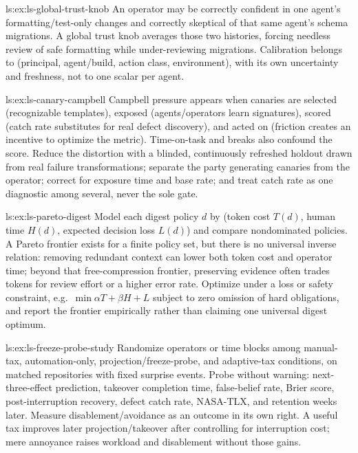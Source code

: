 \begin{pdSolution}{ls:ex:ls-global-trust-knob}
An operator may be correctly confident in one agent's formatting/test-only changes and correctly skeptical of that same agent's schema migrations. A global trust knob averages those two histories, forcing needless review of safe formatting while under-reviewing migrations. Calibration belongs to (principal, agent/build, action class, environment), with its own uncertainty and freshness, not to one scalar per agent.
\end{pdSolution}
\begin{pdSolution}{ls:ex:ls-canary-campbell}
Campbell pressure appears when canaries are selected (recognizable templates), exposed (agents/operators learn signatures), scored (catch rate substitutes for real defect discovery), and acted on (friction creates an incentive to optimize the metric). Time-on-task and breaks also confound the score. Reduce the distortion with a blinded, continuously refreshed holdout drawn from real failure transformations; separate the party generating canaries from the operator; correct for exposure time and base rate; and treat catch rate as one diagnostic among several, never the sole gate.
\end{pdSolution}
\begin{pdSolution}{ls:ex:ls-pareto-digest}
Model each digest policy $d$ by (token cost $T(d)$, human time $H(d)$, expected decision loss $L(d)$) and compare nondominated policies. A Pareto frontier exists for a finite policy set, but there is no universal inverse relation: removing redundant context can lower both token cost and operator time; beyond that free-compression frontier, preserving evidence often trades tokens for review effort or a higher error rate. Optimize under a loss or safety constraint, e.g.\ $\min \alpha T+\beta H+L$ subject to zero omission of hard obligations, and report the frontier empirically rather than claiming one universal digest optimum.
\end{pdSolution}
\begin{pdSolution}{ls:ex:ls-freeze-probe-study}
Randomize operators or time blocks among manual-tax, automation-only, projection/freeze-probe, and adaptive-tax conditions, on matched repositories with fixed surprise events. Probe without warning: next-three-effect prediction, takeover completion time, false-belief rate, Brier score, post-interruption recovery, defect catch rate, NASA-TLX, and retention weeks later. Measure disablement/avoidance as an outcome in its own right. A useful tax improves later projection/takeover after controlling for interruption cost; mere annoyance raises workload and disablement without those gains.
\end{pdSolution}
